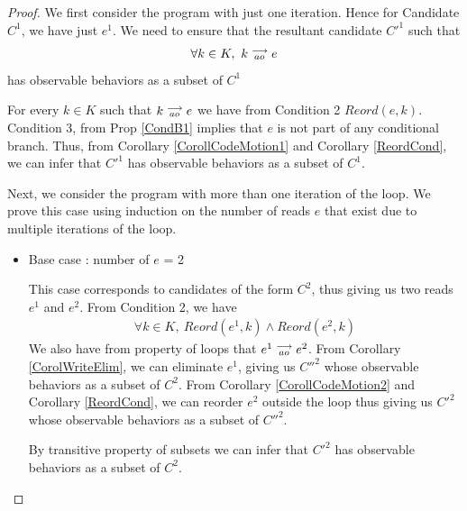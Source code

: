             \begin{proof}


                We first consider the program with just one iteration. Hence for Candidate $C^1$, we have just $e^1$. 
                We need to ensure that the resultant candidate $C'^1$ such that 
                \begin{align*}
                    \forall k \in K, \ k\stackrel{\longrightarrow}{_{ao}}e
                \end{align*}  
                has observable behaviors as a subset of $C^1$

                For every $k \in K$ such that $k\stackrel{\longrightarrow}{_{ao}}e$ we have from Condition 2 $Reord(e, k)$. 
                Condition 3, from Prop \ref{CondB1} implies that $e$ is not part of any conditional branch.
                Thus, from Corollary \ref{CorollCodeMotion1} and Corollary \ref{ReordCond}, we can infer that $C'^1$ has observable behaviors as a subset of $C^1$. 
                
                Next, we consider the program with more than one iteration of the loop. 
                We prove this case using induction on the number of reads $e$ that exist due to multiple iterations of the loop. 


                \begin{itemize}

                    \item Base case : number of $e$ = 2
                
                    This case corresponds to candidates of the form $C^2$, thus giving us two reads $e^1$ and $e^2$.
                    From Condition 2, we have
                    \begin{align*}
                        \forall k \in K, \ Reord(e^1, k) \wedge Reord(e^2, k)
                    \end{align*} 
                    We also have from property of loops that $e^1\stackrel{\longrightarrow}{_{ao}}e^2$.
                    From Corollary \ref{CorolWriteElim}, we can eliminate $e^1$, giving us $C''^2$ whose observable behaviors as a subset of $C^2$.  
                    From Corollary \ref{CorollCodeMotion2} and Corollary \ref{ReordCond}, we can reorder $e^2$ outside the loop thus giving us $C'^2$ whose observable behaviors as a subset of $C''^2$.
                    
                    By transitive property of subsets we can infer that $C'^2$ has observable behaviors as a subset of $C^2$.
                    

\end{itemize}
\end{proof}
